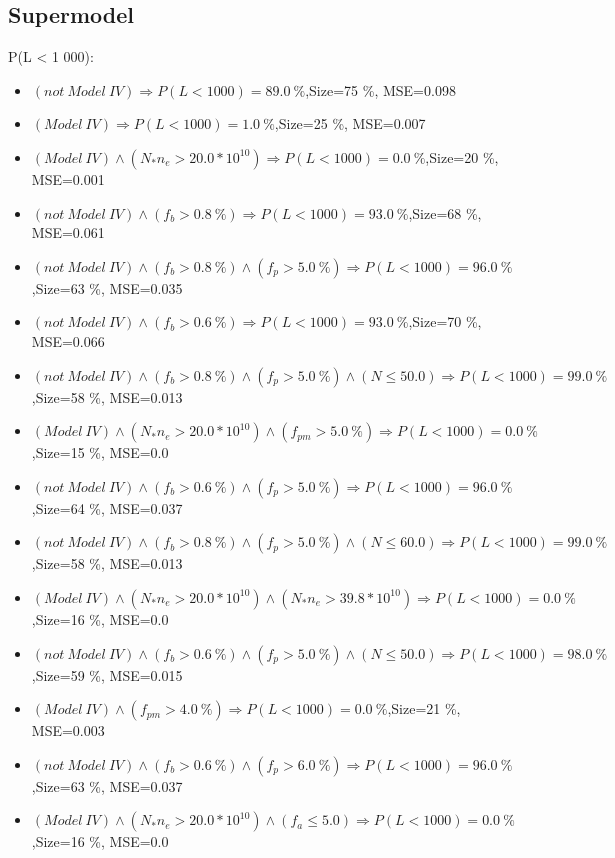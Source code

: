 \documentclass[numbered]{CSL}
\begin{document}
\subsection{Supermodel}
P(L < 1 000):
\begin{itemize}
\item $(not~Model~IV) \Rightarrow P(L < 1 000) = 89.0~\%$,\hfill Size=75 \%, MSE=0.098
\item $(Model~IV) \Rightarrow P(L < 1 000) = 1.0~\%$,\hfill Size=25 \%, MSE=0.007
\item $(Model~IV) \land (N_* n_e > 20.0 * 10^{10}) \Rightarrow P(L < 1 000) = 0.0~\%$,\hfill Size=20 \%, MSE=0.001
\item $(not~Model~IV) \land (f_b > 0.8~\%) \Rightarrow P(L < 1 000) = 93.0~\%$,\hfill Size=68 \%, MSE=0.061
\item $(not~Model~IV) \land (f_b > 0.8~\%) \land (f_p > 5.0~\%) \Rightarrow P(L < 1 000) = 96.0~\%$,\hfill Size=63 \%, MSE=0.035
\item $(not~Model~IV) \land (f_b > 0.6~\%) \Rightarrow P(L < 1 000) = 93.0~\%$,\hfill Size=70 \%, MSE=0.066
\item $(not~Model~IV) \land (f_b > 0.8~\%) \land (f_p > 5.0~\%) \land (N \leq 50.0) \Rightarrow P(L < 1 000) = 99.0~\%$,\hfill Size=58 \%, MSE=0.013
\item $(Model~IV) \land (N_* n_e > 20.0 * 10^{10}) \land (f_{pm} > 5.0~\%) \Rightarrow P(L < 1 000) = 0.0~\%$,\hfill Size=15 \%, MSE=0.0
\item $(not~Model~IV) \land (f_b > 0.6~\%) \land (f_p > 5.0~\%) \Rightarrow P(L < 1 000) = 96.0~\%$,\hfill Size=64 \%, MSE=0.037
\item $(not~Model~IV) \land (f_b > 0.8~\%) \land (f_p > 5.0~\%) \land (N \leq 60.0) \Rightarrow P(L < 1 000) = 99.0~\%$,\hfill Size=58 \%, MSE=0.013
\item $(Model~IV) \land (N_* n_e > 20.0 * 10^{10}) \land (N_* n_e > 39.8 * 10^{10}) \Rightarrow P(L < 1 000) = 0.0~\%$,\hfill Size=16 \%, MSE=0.0
\item $(not~Model~IV) \land (f_b > 0.6~\%) \land (f_p > 5.0~\%) \land (N \leq 50.0) \Rightarrow P(L < 1 000) = 98.0~\%$,\hfill Size=59 \%, MSE=0.015
\item $(Model~IV) \land (f_{pm} > 4.0~\%) \Rightarrow P(L < 1 000) = 0.0~\%$,\hfill Size=21 \%, MSE=0.003
\item $(not~Model~IV) \land (f_b > 0.6~\%) \land (f_p > 6.0~\%) \Rightarrow P(L < 1 000) = 96.0~\%$,\hfill Size=63 \%, MSE=0.037
\item $(Model~IV) \land (N_* n_e > 20.0 * 10^{10}) \land (f_a \leq 5.0) \Rightarrow P(L < 1 000) = 0.0~\%$,\hfill Size=16 \%, MSE=0.0

\end{itemize}
\end{document}
